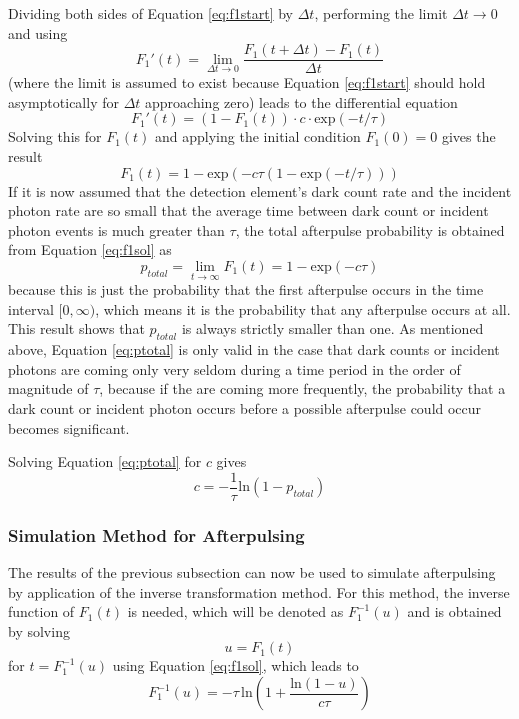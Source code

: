 Dividing both sides of Equation \ref{eq:f1start} by $\Delta t$, performing the limit $\Delta t \to 0$ and using
\begin{equation}
\label{eq:f1dlim}
F_1'(t)=\lim_{\Delta t \to 0} \frac{F_1(t+\Delta t) - F_1(t)}{\Delta t}
\end{equation}
(where the limit is assumed to exist because Equation \ref{eq:f1start} should hold asymptotically for $\Delta t$ approaching zero) leads to the differential equation
\begin{equation}
\label{eq:f1de}
F_1'(t)=(1-F_1(t)) \cdot c \cdot \mathrm{exp}(-t/\tau)
\end{equation}
Solving this for $F_1(t)$ and applying the initial condition $F_1(0)=0$ gives the result
\begin{equation}
\label{eq:f1sol}
F_1(t)=1-\mathrm{exp}(-c \tau (1 - \mathrm{exp}(-t/\tau)))
\end{equation}
If it is now assumed that the detection element's dark count rate and the incident photon rate are so small that the average time between dark count or incident photon events is much greater than $\tau$, the total afterpulse probability is obtained from Equation \ref{eq:f1sol} as
\begin{equation}
\label{eq:ptotal}
p_{total}=\lim_{t \to \infty} F_1(t)=1-\mathrm{exp}(-c \tau)
\end{equation}
because this is just the probability that the first afterpulse occurs in the time interval $[0, \infty)$, which means it is the probability that any afterpulse occurs at all. This result shows that $p_{total}$ is always strictly smaller than one. As mentioned above, Equation \ref{eq:ptotal} is only valid in the case that dark counts or incident photons are coming only very seldom during a time period in the order of magnitude of $\tau$, because if the are coming more frequently, the probability that a dark count or incident photon occurs before a possible afterpulse could occur becomes significant.

Solving Equation \ref{eq:ptotal} for $c$ gives
\begin{equation}
\label{eq:csol}
c=-\frac{1}{\tau}\mathrm{ln}(1-p_{total})
\end{equation}

\subsubsection{Simulation Method for Afterpulsing}

The results of the previous subsection can now be used to simulate afterpulsing by application of the inverse transformation method. For this method, the inverse function of $F_1(t)$ is needed, which will be denoted as $F_1^{-1}(u)$ and is obtained by solving
\begin{equation*}
u=F_1(t)
\end{equation*}
for $t = F_1^{-1}(u)$ using Equation \ref{eq:f1sol}, which leads to
\begin{equation}
\label{eq:f1inv}
F_1^{-1}(u)=-\tau\,\mathrm{ln}\left(1+\frac{\mathrm{ln}(1-u)}{c\tau}\right)
\end{equation}

